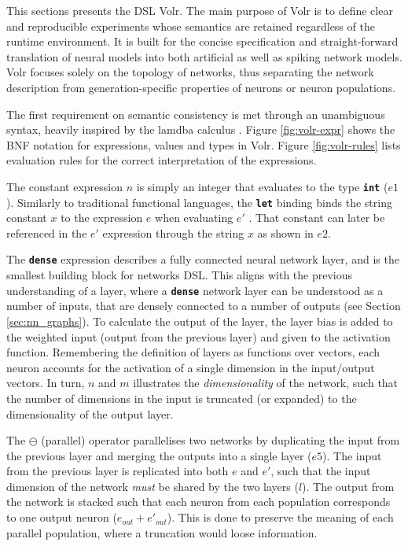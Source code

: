 This sections presents the \gls{DSL} Volr. 
The main purpose of Volr is to define clear and reproducible
experiments whose semantics are retained regardless of
the runtime environment.
It is built for the concise specification and straight-forward
translation of neural models into both artificial as well as
spiking network models.
Volr focuses solely on the topology of networks, thus
separating the network description from generation-specific
properties of neurons or neuron populations.

The first requirement on semantic consistency is met through an unambiguous
syntax, heavily inspired by the lamdba calculus \cite{Pierce2002}.
Figure \ref{fig:volr-expr} shows the BNF notation for expressions, values and types
in Volr. 
Figure \ref{fig:volr-rules} lists evaluation rules for the correct
interpretation of the expressions.




The constant expression $n$ is simply an integer that evaluates to the type 
\texttt{\textbf{int}} ($e1$). 
Similarly to traditional functional languages, the \texttt{\textbf{let}} binding binds
the string constant $x$ to the expression $e$ when evaluating $e'$ \cite{Pierce2002}.
That constant can later be referenced in the $e'$ expression 
through the string $x$ as shown in $e2$.

The \texttt{\textbf{dense}} expression describes a fully connected
neural network layer, and is the smallest building block for networks
\gls{DSL}.
This aligns with the previous understanding of a layer, where
a \texttt{\textbf{dense}} network layer can be understood as a number of inputs,
that are densely connected to a number of outputs (see Section
\ref{sec:nn_graphs}).
To calculate the output of the layer, the layer bias is added to the
weighted input (output from the previous layer) and given 
to the activation function.
Remembering the definition of layers as functions over vectors, each neuron 
accounts for the activation of a single dimension in the input/output vectors.
In turn, $n$ and $m$ illustrates the \textit{dimensionality} of the network,
such that the number of dimensions in the input is truncated (or expanded) to
the dimensionality of the output layer.

The $\ominus$ (parallel) operator parallelises two networks by duplicating
the input from the previous layer and merging the outputs into a single
layer ($e5$).
The input from the previous layer is replicated into both $e$ and $e'$, such
that the input dimension of the network \textit{must} be shared by the two layers ($l$).
The output from the network is stacked such that each neuron from each
population corresponds to one output neuron ($e_{out} + e'_{out}$).
This is done to preserve the meaning of each parallel population, where
a truncation would loose information.


